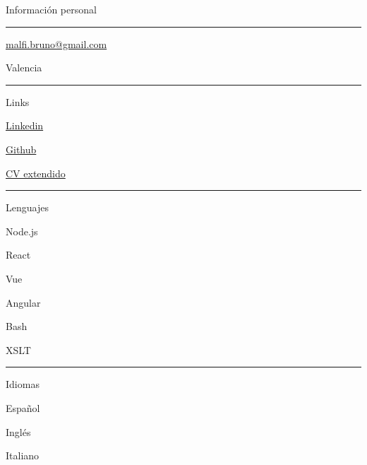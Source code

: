\documentclass{letter}
\begin{document}
\begin{minipage}[t]{0.40\textwidth}
\setlength{\baselineskip}{1.5\baselineskip}
\color{white}
\vspace{1cm}
{\large Información personal}

\rule{\linewidth}{0.4pt}

\faPhone \quad  

\faEnvelope \quad \href{malfi.bruno@gmail.com}{malfi.bruno@gmail.com}


\faMapMarker \quad Valencia

\rule{\linewidth}{0.4pt}

{\large Links}

\faLinkedin \quad \href{https://www.linkedin.com/in/bruno-malfi-fabeiro}{Linkedin}

\faGithub \quad \href{https://github.com/BrunoMalfi}{Github}

\faPaperclip \quad \href{https://github.com/BrunoMalfi/CV/blob/main/CV_ES.md}{CV extendido}

\rule{\linewidth}{0.4pt}

{\large Lenguajes}

\faNode \quad Node.js

\faReact \quad React

\faVuejs \quad Vue

\faAngular \quad Angular

\faLinux \quad Bash

\faCircleNotch \quad XSLT


\rule{\linewidth}{0.4pt}

{\large Idiomas}

\faLanguage \quad Español

\faLanguage \quad Inglés

\faLanguage \quad Italiano

\end{minipage}
\hfill
\end{document}
